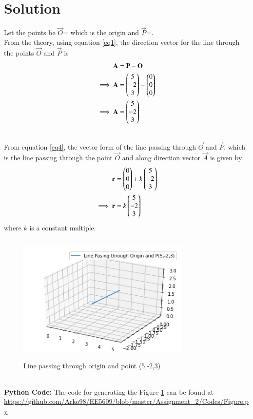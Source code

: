\documentclass[journal,12pt,twocolumn]{IEEEtran}
\begin{document}
\section{\textbf{Solution}}
Let the points be $\vec{O}$= which is the origin and $\vec{P}$=.\\
From the theory, using equation \ref{eq1}, the direction vector for the line through the points $\vec{O}$ and $\vec{P}$ is
\begin{align}
\mathbf{A} &= \mathbf{P}-\mathbf{O} \\
\implies\mathbf{A} & = \begin{pmatrix} 5 \\ -2 \\ 3 \end{pmatrix} - \begin{pmatrix} 0 \\ 0 \\ 0\end{pmatrix} \\
\implies\mathbf{A} &= \begin{pmatrix} 5 \\ -2 \\ 3 \end{pmatrix}
\end{align}

\\From equation \ref{eq4}, the vector form of the line passing through $\vec{O}$ and $\vec{P}$, which is the line passing through the point $\vec{O}$ and along direction vector $\vec{A}$ is given by
\begin{align}
\mathbf{r} &= \begin{pmatrix}0 \\ 0 \\ 0\end{pmatrix}+k\begin{pmatrix}5 \\ -2 \\ 3\end{pmatrix}\\
\implies\mathbf{r} &= k\begin{pmatrix}5 \\ -2 \\ 3\end{pmatrix}
\end{align}
where $k$ is a constant multiple.
\renewcommand{\thefigure}{\arabic{figure}}
\begin{figure}[h!]
    \centering
    \includegraphics[height=6.5cm,width = 8.6cm]{Line_Image.png}
    \caption{Line passing through origin and point (5,-2,3)}
    \label{myfig}
\end{figure}\\
\textbf{Python Code: }The code for generating the Figure \ref{myfig} can be found at \url{https://github.com/Arko98/EE5609/blob/master/Assignment_2/Codes/Figure.py}
\end{document}
